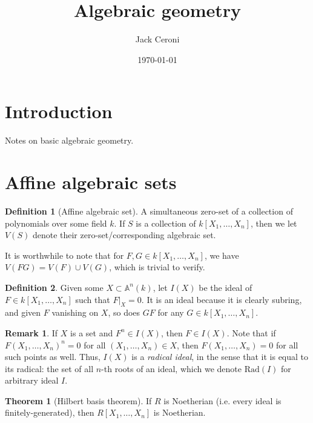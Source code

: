 \documentclass[aps,pra,showpacs,notitlepage,onecolumn,superscriptaddress,nofootinbib]{revtex4-1}
\theoremstyle{definition}
\newtheorem{definition}{Definition}[section]
\newtheorem{theorem}{Theorem}[section]
\newtheorem{remark}{Remark}[section]
\begin{document}
\title{Algebraic geometry}
\author{Jack Ceroni}
\date{\today}
\maketitle

\tableofcontents

\newpage

\section{Introduction}

\noindent Notes on basic algebraic geometry.

\section{Affine algebraic sets}

\begin{definition}[Affine algebraic set]
  A simultaneous zero-set of a collection of polynomials over some field $k$. If $S$ is a collection of $k[X_1, \dots, X_n]$, then we let $V(S)$ denote their zero-set/corresponding algebraic set.
\end{definition}

\noindent It is worthwhile to note that for $F, G \in k[X_1, \dots, X_n]$, we have $V(FG) = V(F) \cup V(G)$, which is trivial to verify.

\begin{definition}
  Given some $X \subset \mathbb{A}^n(k)$, let $I(X)$ be the ideal of $F \in k[X_1, \dots, X_n]$ such that $F|_X = 0$. It is an ideal because it is clearly subring, and given $F$ vanishing
  on $X$, so does $GF$ for any $G \in k[X_1, \dots, X_n]$.
  \end{definition}

\begin{remark}
  If $X$ is a set and $F^n \in I(X)$, then $F \in I(X)$. Note that if $F(X_1, \dots, X_n)^n = 0$
  for all $(X_1, \dots, X_n) \in X$, then $F(X_1, \dots, X_n) = 0$ for all such points as well. Thus,
  $I(X)$ is a \emph{radical ideal}, in the sense that it is equal to its radical: the set of all $n$-th roots
  of an ideal, which we denote $\text{Rad}(I)$ for arbitrary ideal $I$.
  \end{remark}

\begin{theorem}[Hilbert basis theorem]
  If $R$ is Noetherian (i.e. every ideal is finitely-generated), then $R[X_1, \dots, X_n]$ is Noetherian.
  \end{theorem}
\end{document}
